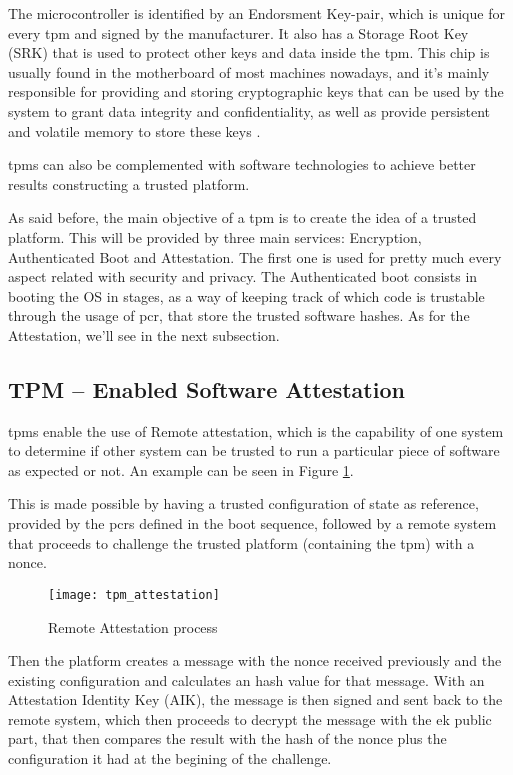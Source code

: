 The microcontroller is identified by an Endorsment Key-pair, which is unique for every \gls{tpm} and signed by the manufacturer. It also has a Storage Root Key (SRK) that is used to protect other keys and data inside the \gls{tpm}. 
This chip is usually found in the motherboard of most machines nowadays, and it's mainly responsible for providing and storing cryptographic keys that can be used by the system to grant data integrity and confidentiality, as well as provide persistent and volatile memory to store these keys \cite{sgxCloudThesis}.

\gls{tpm}s can also be complemented with software technologies to achieve better results constructing a trusted platform. 

As said before, the main objective of a \gls{tpm} is to create the idea of a trusted platform. This will be  provided by three main services: Encryption, Authenticated Boot and Attestation. The first one is used for pretty much every aspect related with security and privacy. The Authenticated boot consists in booting the OS in stages, as a way of keeping track of which code is trustable through the usage of \gls{pcr}, that store the trusted software hashes. As for the Attestation, we'll see in the next subsection.


\subsection{TPM – Enabled Software Attestation}
\label{ssec:tpm_attest}

\gls{tpm}s enable the use of Remote attestation, which is the capability of one system to determine if other system can be trusted to run a particular piece of software as expected or not. An example can be seen in Figure \ref{fig:tpm_attestation}.

This is made possible by having a trusted configuration of state as reference, provided by the \gls{pcr}s defined in the boot sequence, followed by a remote system that proceeds to challenge the trusted platform (containing the \gls{tpm}) with a nonce. 

\begin{figure}[htbp]
	\centering
	{\texttt{[image: tpm\_attestation]}}%
	\caption{Remote Attestation process}
	\label{fig:tpm_attestation}
\end{figure}

Then the platform creates a message with the nonce received previously and the existing configuration and calculates an hash value for that message. With an Attestation Identity Key (AIK), the message is then signed and sent back to the remote system, which then proceeds to decrypt the message with the \gls{ek} public part, that then compares the result with the hash of the nonce plus the configuration it had at the begining of the challenge. 

